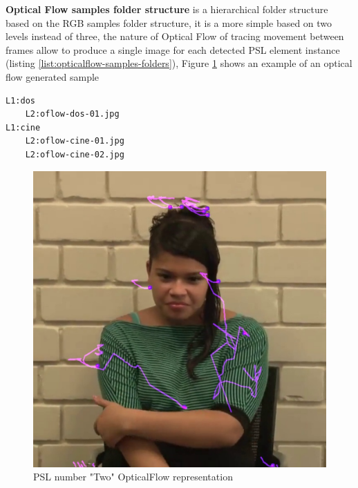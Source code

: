 \documentclass[twocolumn,conference]{article}
\begin{document}
\textbf{Optical Flow samples folder structure} is a hierarchical folder structure based on the RGB samples folder structure, it is a more simple based on two levels instead of three, the nature of Optical Flow of tracing movement between frames allow to produce a single image for each detected PSL element instance (listing \ref{list:opticalflow-samples-folders}), Figure \ref{fig:opticalflow-two} shows an example of an optical flow generated sample
\begin{lstlisting}[caption=Optical Flow Samples Folder Structure example, basicstyle=\ttfamily\small]
L1:dos
	L2:oflow-dos-01.jpg
L1:cine
	L2:oflow-cine-01.jpg
	L2:oflow-cine-02.jpg
\end{lstlisting}\label{list:opticalflow-samples-folders}
\begin{figure}[hbt!]
\includegraphics[width=\linewidth]{images/dos-opticalflow.jpg}
\caption{PSL number "Two" OpticalFlow representation}
\label{fig:opticalflow-two}
\end{figure}
\end{document}
